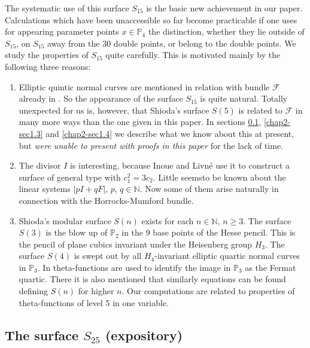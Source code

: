 The systematic use of this surface $S_{15}$ is the basic new
achievement in our paper. Calculations which have been unaccessible so
far become practicable if one uses for appearing parameter points
$x\in \mathbb{P}_{4}$ the distinction, whether they lie outside of
$S_{15}$, on $S_{15}$ away from the 30 double points, or belong to the
double points. We study the properties of $S_{15}$ quite
carefully. This is motivated mainly by the following three reasons:
\begin{enumerate}
\item Elliptic quintic normal curves are mentioned in relation with
bundle $\mathscr{F}$ already in \cite{chap2-key6}. So the appearance
of the surface $S_{15}$ is quite natural. Totally unexpected for us
is, however, that Shioda's surface $S(5)$ is related to $\mathscr{F}$
in many more ways than the one given in this paper. In
sections \ref{chap2-sec1.2}, \ref{chap2-sec1.3} and \ref{chap2-sec1.4}
we describe what we know about this at present, but {\em were unable
to present with proofs in this paper} for the lack of time.

\item The divisor $I$ is interesting, because Inoue and Livn\'e use it
to construct a surface of general type with $c^{2}_{1}=3c_{2}$. Little
seems\pageoriginale to be known about the linear systems $|pI+qF|$,
$p$, $q\in \mathbb{N}$. Now some of them arise naturally in connection
with the Horrocks-Mumford bundle.

\item  Shioda's modular surface $S(n)$ exists for each
$n\in \mathbb{N}$, $n\geq 3$. The surface $S(3)$ is the blow up of
$\mathbb{P}_{2}$ in the 9 base points of the Hesse pencil. This is the
pencil of plane cubics invariant under the Heisenberg group
$H_{3}$. The surface $S(4)$ is swept out by all $H_{4}$-invariant
elliptic quartic normal curves in
$\mathbb{P}_{3}$. In \cite[p.~55]{chap2-key9} theta-functions are used
to identify the image in $\mathbb{P}_{3}$ as the Fermat quartic. There
it is also mentioned that similarly equations can be found defining
$S(n)$ for higher $n$. Our computations are related to properties of
theta-functions of level 5 in one variable. 
\end{enumerate}

\subsection{The surface \texorpdfstring{\boldmath$S_{25}$}{S25} (expository)}\label{chap2-sec1.2}


